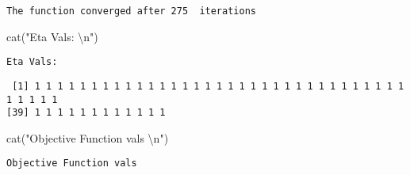 \documentclass[
  letterpaper,
  DIV=11,
  numbers=noendperiod]{scrartcl}
\newenvironment{Shaded}{\begin{snugshade}}{\end{snugshade}}
\newcommand{\DecValTok}[1]{\textcolor[rgb]{0.68,0.00,0.00}{#1}}
\newcommand{\FunctionTok}[1]{\textcolor[rgb]{0.28,0.35,0.67}{#1}}
\newcommand{\NormalTok}[1]{\textcolor[rgb]{0.00,0.23,0.31}{#1}}
\newcommand{\SpecialCharTok}[1]{\textcolor[rgb]{0.37,0.37,0.37}{#1}}
\newcommand{\StringTok}[1]{\textcolor[rgb]{0.13,0.47,0.30}{#1}}
\begin{document}
\begin{Shaded}
\end{Shaded}

\begin{verbatim}
The function converged after 275  iterations 
\end{verbatim}

\begin{Shaded}
\begin{Highlighting}[]
\FunctionTok{cat}\NormalTok{(}\StringTok{"Eta Vals: }\SpecialCharTok{\textbackslash{}n}\StringTok{"}\NormalTok{)}
\end{Highlighting}
\end{Shaded}

\begin{verbatim}
Eta Vals: 
\end{verbatim}

\begin{Shaded}
\end{Shaded}

\begin{verbatim}
 [1] 1 1 1 1 1 1 1 1 1 1 1 1 1 1 1 1 1 1 1 1 1 1 1 1 1 1 1 1 1 1 1 1 1 1 1 1 1 1
[39] 1 1 1 1 1 1 1 1 1 1 1 1
\end{verbatim}

\begin{Shaded}
\begin{Highlighting}[]
\FunctionTok{cat}\NormalTok{(}\StringTok{"Objective Function vals }\SpecialCharTok{\textbackslash{}n}\StringTok{"}\NormalTok{)}
\end{Highlighting}
\end{Shaded}

\begin{verbatim}
Objective Function vals 
\end{verbatim}

\begin{Shaded}
\end{Shaded}
\end{document}
